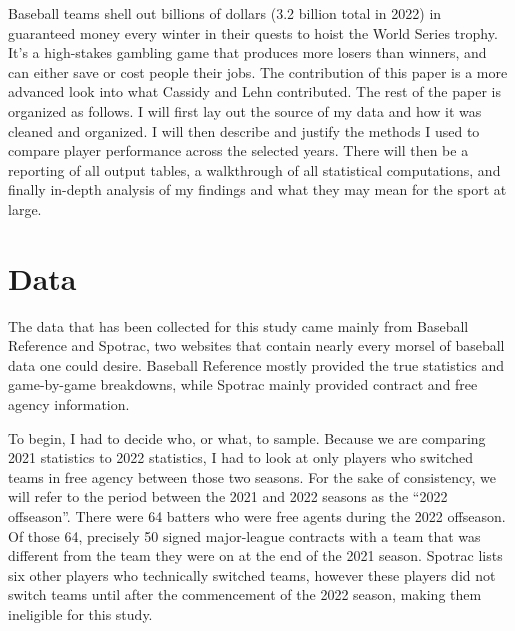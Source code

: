 \documentclass[10pt]{article}
\begin{document}
Baseball teams shell out billions of dollars (3.2 billion total in 2022) in guaranteed money every winter in their quests to 
hoist the World Series trophy. It’s a high-stakes gambling game that produces more losers than winners, and can either save or 
cost people their jobs. The contribution of this paper is a more advanced look into what Cassidy and Lehn contributed. The rest 
of the paper is organized as follows. I will first lay out the source of my data and how it was cleaned and organized. I will 
then describe and justify the methods I used to compare player performance across the selected years. There will then be a 
reporting of all output tables, a walkthrough of all statistical computations, and finally in-depth analysis of my findings 
and what they may mean for the sport at large. 

\section{Data}

The data that has been collected for this study came mainly from Baseball Reference and Spotrac, two websites that contain 
nearly every morsel of baseball data one could desire. Baseball Reference mostly provided the true statistics and game-by-game 
breakdowns, while Spotrac mainly provided contract and free agency information. 

To begin, I had to decide who, or what, to sample. Because we are comparing 2021 statistics to 2022 statistics, I had to look 
at only players who switched teams in free agency between those two seasons. For the sake of consistency, we will refer to the 
period between the 2021 and 2022 seasons as the “2022 offseason”. There were 64 batters who were free agents during the 2022 
offseason. Of those 64, precisely 50 signed major-league contracts with a team that was different from the team they were on 
at the end of the 2021 season. Spotrac lists six other players who technically switched teams, however these players did not 
switch teams until after the commencement of the 2022 season, making them ineligible for this study.
\end{document}

